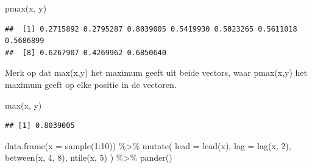 \documentclass[]{tufte-book}
\newenvironment{Shaded}{}{}
\newcommand{\AttributeTok}[1]{\textcolor[rgb]{0.49,0.56,0.16}{#1}}
\newcommand{\DecValTok}[1]{\textcolor[rgb]{0.25,0.63,0.44}{#1}}
\newcommand{\FunctionTok}[1]{\textcolor[rgb]{0.02,0.16,0.49}{#1}}
\newcommand{\NormalTok}[1]{#1}
\newcommand{\SpecialCharTok}[1]{\textcolor[rgb]{0.25,0.44,0.63}{#1}}
\begin{document}
\begin{Shaded}
\begin{Highlighting}[]
\FunctionTok{pmax}\NormalTok{(x, y)}
\end{Highlighting}
\end{Shaded}

\begin{verbatim}
##  [1] 0.2715892 0.2795287 0.8039005 0.5419930 0.5023265 0.5611018 0.5686899
##  [8] 0.6267907 0.4269962 0.6850640
\end{verbatim}

Merk op dat max(x,y) het maximum geeft uit beide vectors, waar pmax(x,y) het maximum geeft op elke positie in de vectoren.

\begin{Shaded}
\begin{Highlighting}[]
\FunctionTok{max}\NormalTok{(x, y)}
\end{Highlighting}
\end{Shaded}

\begin{verbatim}
## [1] 0.8039005
\end{verbatim}

\begin{Shaded}
\begin{Highlighting}[]
\FunctionTok{data.frame}\NormalTok{(}\AttributeTok{x =} \FunctionTok{sample}\NormalTok{(}\DecValTok{1}\SpecialCharTok{:}\DecValTok{10}\NormalTok{)) }\SpecialCharTok{\%\textgreater{}\%}
  \FunctionTok{mutate}\NormalTok{(}
    \AttributeTok{lead =} \FunctionTok{lead}\NormalTok{(x),}
    \AttributeTok{lag =} \FunctionTok{lag}\NormalTok{(x, }\DecValTok{2}\NormalTok{),}
    \FunctionTok{between}\NormalTok{(x, }\DecValTok{4}\NormalTok{, }\DecValTok{8}\NormalTok{),}
    \FunctionTok{ntile}\NormalTok{(x, }\DecValTok{5}\NormalTok{)}
\NormalTok{  ) }\SpecialCharTok{\%\textgreater{}\%}
  \FunctionTok{pander}\NormalTok{()}
\end{Highlighting}
\end{Shaded}
\end{document}
